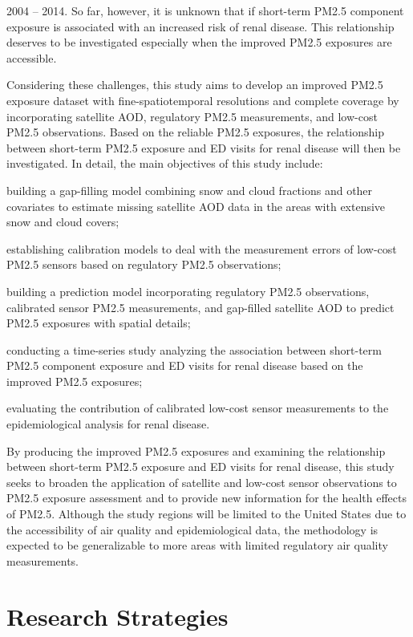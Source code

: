 \documentclass[11pt]{article}
\begin{document}
2004 -- 2014. So far, however, it is unknown that if short-term PM2.5 component exposure is associated with an increased risk of renal disease. This relationship deserves to be investigated especially when the improved PM2.5 exposures are accessible. 

Considering these challenges, this study aims to develop an improved PM2.5 exposure dataset with fine-spatiotemporal resolutions and complete coverage by incorporating satellite AOD, regulatory PM2.5 measurements, and low-cost PM2.5 observations. Based on the reliable PM2.5 exposures, the relationship between short-term PM2.5 exposure and ED visits for renal disease will then be investigated. In detail, the main objectives of this study include:
\begin{enumerate*}[{[1)]}]
\item building a gap-filling model combining snow and cloud fractions and other covariates to estimate missing satellite AOD data in the areas with extensive snow and cloud covers; 
\item establishing calibration models to deal with the measurement errors of low-cost PM2.5 sensors based on regulatory PM2.5 observations; 
\item building a prediction model incorporating regulatory PM2.5 observations, calibrated sensor PM2.5 measurements, and gap-filled satellite AOD to predict PM2.5 exposures with spatial details; 
\item conducting a time-series study analyzing the association between short-term PM2.5 component exposure and ED visits for renal disease based on the improved PM2.5 exposures; 
\item evaluating the contribution of calibrated low-cost sensor measurements to the epidemiological analysis for renal disease.
\end{enumerate*}

By producing the improved PM2.5 exposures and examining the relationship between short-term PM2.5 exposure and ED visits for renal disease, this study seeks to broaden the application of satellite and low-cost sensor observations to PM2.5 exposure assessment and to provide new information for the health effects of PM2.5. Although the study regions will be limited to the United States due to the accessibility of air quality and epidemiological data, the methodology is expected to be generalizable to more areas with limited regulatory air quality measurements.

\section{Research Strategies}
\end{document}
